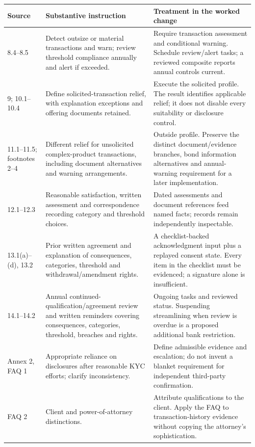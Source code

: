 \endgroup
\begin{longtable}{P{0.14\textwidth}P{0.37\textwidth}P{0.39\textwidth}}

\toprule Source & Substantive instruction & Treatment in the worked change \\\midrule
\endhead
8.4--8.5 & Detect outsize or material transactions and warn; review threshold compliance annually and alert if exceeded. & Require transaction assessment and conditional warning. Schedule review/alert tasks; a reviewed composite reports annual controls current.\\
9; 10.1--10.4 & Define solicited-transaction relief, with explanation exceptions and offering documents retained. & Execute the solicited profile. The result identifies applicable relief; it does not disable every suitability or disclosure control.\\
11.1--11.5; footnotes 2--4 & Different relief for unsolicited complex-product transactions, including document alternatives and warning arrangements. & Outside profile. Preserve the distinct document/evidence branches, bond information alternatives and annual-warning requirement for a later implementation.\\
12.1--12.3 & Reasonable satisfaction, written assessment and correspondence recording category and threshold choices. & Dated assessments and document references feed named facts; records remain independently inspectable.\\
13.1(a)--(d), 13.2 & Prior written agreement and explanation of consequences, categories, threshold and withdrawal/amendment rights. & A checklist-backed acknowledgment input plus a replayed consent state. Every item in the checklist must be evidenced; a signature alone is insufficient.\\
14.1--14.2 & Annual continued-qualification/agreement review and written reminders covering consequences, categories, threshold, breaches and rights. & Ongoing tasks and reviewed status. Suspending streamlining when review is overdue is a proposed additional bank restriction.\\
Annex 2, FAQ 1 & Appropriate reliance on disclosures after reasonable KYC efforts; clarify inconsistency. & Define admissible evidence and escalation; do not invent a blanket requirement for independent third-party confirmation.\\
FAQ 2 & Client and power-of-attorney distinctions. & Attribute qualifications to the client. Apply the FAQ to transaction-history evidence without copying the attorney's sophistication.\\

\end{longtable}
